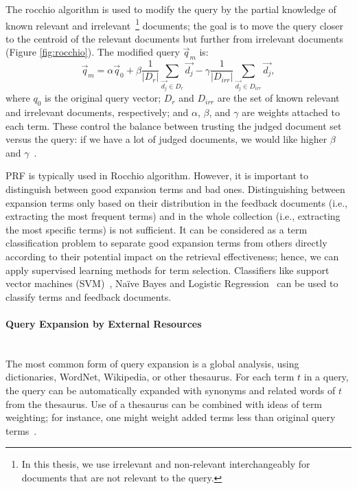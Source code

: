 The rocchio algorithm is used to modify the query by the partial knowledge of known relevant and irrelevant~\footnote{In this thesis, we use irrelevant and non-relevant interchangeably for documents that are not relevant to the query.} documents; the goal is to move the query closer to the centroid of the relevant documents but further from irrelevant documents (Figure \ref{fig:rocchio}). The modified query $ \vec{q}_m $ is:
\begin{equation}
\label{eq:rocchio}
 \vec{q}_{m} = \alpha  \vec{q}_{0} + \beta\frac{1}{|D_{r}|}\sum\limits_{\vec{d_{j}}\in D_{r}} \vec{d_{j}} - \gamma\frac{1}{|D_{irr}|}\sum\limits_{\vec{d_{j}}\in D_{irr}} \vec{d_{j}},
  \end{equation}
where $ q_{0} $ is the original query vector; $ D_{r} $ and $ D_{irr} $ are the set of known relevant and irrelevant documents, respectively; and $ \alpha $, $ \beta $, and $ \gamma $ are weights attached to each term. These control the balance between trusting the judged document set versus the query: if we have a lot of judged documents, we
would like higher $ \beta $ and $ \gamma $~\citep{manning2008introduction}. 

PRF is typically used in Rocchio algorithm. However, it is important to distinguish between good expansion terms and bad ones. Distinguishing between expansion terms only based on their distribution in the feedback documents (i.e., extracting the most frequent terms) and in the whole collection (i.e., extracting the most specific terms) is not sufficient. It can be considered as a term classification problem to separate good expansion terms from others directly according to their potential impact on the retrieval effectiveness; hence, we can apply supervised learning methods for term selection. Classifiers like support vector machines (SVM)~\citep{cao2008selecting}, Na\"ive Bayes and Logistic Regression~\citep{he2009finding} can be used to classify terms and feedback documents.  
\paragraph{Query Expansion by External Resources}
\ \\
The most common form of query expansion is a global analysis, using dictionaries, WordNet, Wikipedia, or other thesaurus. For each term $ t $ in a query, the query can be automatically expanded with synonyms and related words of $ t $ from the thesaurus. Use of a thesaurus can be combined with ideas of term weighting; for instance, one might weight added terms less than original query terms~\citep{manning2008introduction}.